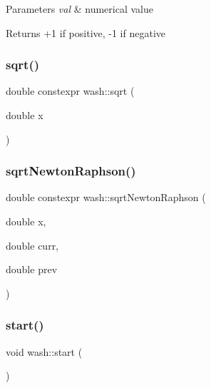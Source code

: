 \begin{DoxyParams}{Parameters}
{\em val} & numerical value \\
\hline
\end{DoxyParams}
\begin{DoxyReturn}{Returns}
+1 if positive, -\/1 if negative 
\end{DoxyReturn}
\mbox{\label{namespacewash_aa7c01695ae3be583edc0ed8c4bd756f5}} 
\subsubsection{\texorpdfstring{sqrt()}{sqrt()}}
{\footnotesize\ttfamily double constexpr wash\+::sqrt (\begin{DoxyParamCaption}\item[{double}]{x }\end{DoxyParamCaption})}

\mbox{\label{namespacewash_a344dd90c7f5c2e7fb6ba80fc25d71bf2}} 
\subsubsection{\texorpdfstring{sqrt\+Newton\+Raphson()}{sqrtNewtonRaphson()}}
{\footnotesize\ttfamily double constexpr wash\+::sqrt\+Newton\+Raphson (\begin{DoxyParamCaption}\item[{double}]{x,  }\item[{double}]{curr,  }\item[{double}]{prev }\end{DoxyParamCaption})}

\mbox{\label{namespacewash_a4c8a9913a535b341da9e72826916544b}} 
\subsubsection{\texorpdfstring{start()}{start()}}
{\footnotesize\ttfamily void wash\+::start (\begin{DoxyParamCaption}{ }\end{DoxyParamCaption})}



